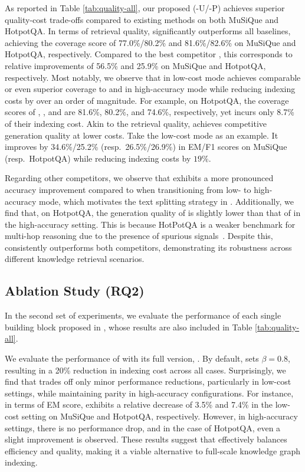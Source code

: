 As reported in Table \ref{tab:quality-all}, our proposed \sketrag(\textsf{-U}/\textsf{-P}) achieves superior quality-cost trade-offs compared to existing methods on both MuSiQue and HotpotQA.
In terms of retrieval quality, \sketrag significantly outperforms all baselines, achieving the coverage score of 77.0\%/80.2\% and 81.6\%/82.6\% on MuSiQue and HotpotQA, respectively. Compared to the best competitor \hybridrag, this corresponds to relative improvements of 56.5\% and 25.9\% on MuSiQue and HotpotQA, respectively. Most notably, we observe that \sketrag in low-cost mode achieves comparable or even superior coverage to \kgrag and \hybridrag in high-accuracy mode while reducing indexing costs by over an order of magnitude. For example, on HotpotQA, the coverage scores of \sketragp, \hybridrag, and \kgrag are 81.6\%, 80.2\%, and 74.6\%, respectively, yet \sketragp incurs only 8.7\% of their indexing cost.
Akin to the retrieval quality, \sketrag achieves competitive generation quality at lower costs. Take the low-cost mode as an example. It improves \hybridrag by 34.6\%/25.2\% (resp.\ 26.5\%/26.9\%) in EM/F1 scores on MuSiQue (resp.\ HotpotQA) while reducing indexing costs by $19\%$.

Regarding other competitors, we observe that \textrag exhibits a more pronounced accuracy improvement compared to \kgrag when transitioning from low- to high-accuracy mode, which motivates the text splitting strategy in \sketrag.
Additionally, we find that, on HotpotQA, the generation quality of \kgrag is slightly lower than that of \textrag in the high-accuracy setting. This is because HotPotQA is a weaker benchmark for multi-hop reasoning due to the presence of spurious signals~\cite{gutierrez2024hipporag, trivedi2022musique}. Despite this, \sketrag consistently outperforms both competitors, demonstrating its robustness across different knowledge retrieval scenarios.




\subsection{Ablation Study (RQ2)}
In the second set of experiments, we evaluate the performance of each single building block proposed in \sketrag, whose results are also included in Table \ref{tab:quality-all}.

We evaluate the performance of \skeletonrag with its full version, \kgrag. By default, \skeletonrag sets $\beta=0.8$, resulting in a 20\% reduction in indexing cost across all cases. 
Surprisingly, we find that \skeletonrag trades off only minor performance reductions, particularly in low-cost settings, while maintaining parity in high-accuracy configurations. For instance, in terms of EM score, \skeletonrag exhibits a relative decrease of 3.5\% and 7.4\% in the low-cost setting on MuSiQue and HotpotQA, respectively. However, in high-accuracy settings, there is no performance drop, and in the case of HotpotQA, even a slight improvement is observed. These results suggest that \skeletonrag effectively balances efficiency and quality, making it a viable alternative to full-scale knowledge graph indexing.

